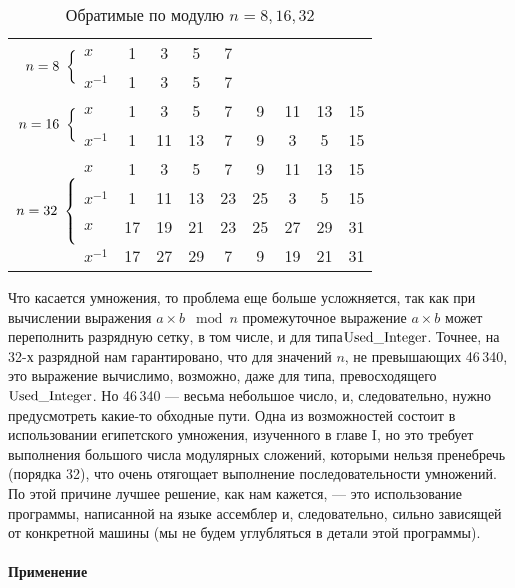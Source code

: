 \documentclass{../../template/mai_book}
\begin{document}
    \renewcommand{\baselinestretch}{1.25}
    \begin{table}[h!]
    \centering
    \begin{tabular}{|rl|cccccccc|}
    \hline
    \multirow{2}{*}{$n = 8\ \left\{\vrule height 3.175ex depth 0pt width 0pt\right.\!\!\!\!\!$} & $x$ & 1 & 3 & 5 & 7 & \multicolumn{1}{l}{} & \multicolumn{1}{l}{} & \multicolumn{1}{l}{} & \multicolumn{1}{l|}{} \\ \cline{2-10}
    & $x^{-1}$ & 1 & 3 & 5 & 7 & \multicolumn{1}{l}{} & \multicolumn{1}{l}{} & \multicolumn{1}{l}{} & \multicolumn{1}{l|}{} \\ \hline
    \multirow{2}{*}{$n = 16\ \left\{\vrule height 3.1755ex depth 0pt width 0pt\right.\!\!\!\!\!$} & $x$ & 1 & 3 & 5 & 7 & 9 & 11 & 13 & 15 \\ \cline{2-10}
    & $x^{-1}$ & 1 & 11 & 13 & 7 & 9 & 3 & 5 & 15 \\ \hline
    \multirow{4}{*}{$n = 32\ \left\{\vrule height 6.175ex depth 0pt width 0pt\right.\!\!\!\!\!$} & $x$ & 1 & 3 & 5 & 7 & 9 & 11 & 13 & 15 \\ \cline{2-10}
    & $x^{-1}$ & 1 & 11 & 13 & 23 & 25 & 3 & 5 & 15 \\ \cline{2-10}
    & $x$ & 17 & 19 & 21 & 23 & 25 & 27 & 29 & 31 \\ \cline{2-10}
    & $x^{-1}$ & 17 & 27 & 29 & 7 & 9 & 19 & 21 & 31 \\ \hline
    \end{tabular}
    \caption{Обратимые по модулю $n = 8, 16, 32$}
    \label{my-label}
    \end{table}

    Что касается умножения, то проблема еще больше усложняется, так как при вычислении выражения $ a\times b\; \bmod n$ промежуточное выражение $ a\times b$ может переполнить разрядную сетку, в том числе, и для типа\linebreak $\lstinline{Used_Integer}$. Точнее, на 32-х разрядной нам гарантировано, что для значений $n$, не превышающих 46\,340, это выражение вычислимо, возможно, даже для типа, превосходящего $\lstinline{Used_Integer}$. Но 46\,340 — весьма небольшое число, и, следовательно, нужно предусмотреть какие-то обходные пути. Одна из возможностей состоит в использовании египетского умножения, изученного в главе I, но это требует выполнения большого числа модулярных сложений, которыми нельзя пренебречь (порядка 32), что очень отягощает выполнение последовательности умножений. По этой причине лучшее решение, как нам кажется, — это использование программы, написанной на языке ассемблер и, следовательно, сильно зависящей от конкретной машины (мы не будем углубляться в детали этой программы).\\\\
    {\textbf{Применение}}
\end{document}
